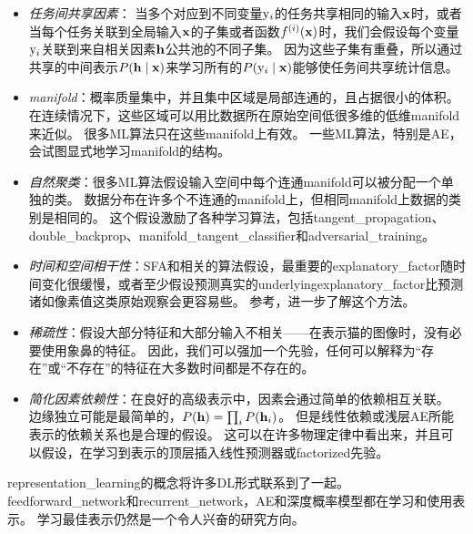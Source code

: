 \begin{itemize}
	\item \emph{任务间共享因素}：
	当多个对应到不同变量$\mathrm{y}_i$的任务共享相同的输入$\mathbf{x}$时，或者当每个任务关联到全局输入$\mathbf{x}$的子集或者函数$f^{(i)}(\mathbf{x})$时，我们会假设每个变量$\mathrm{y}_i$关联到来自相关因素$\mathbf{h}$公共池的不同子集。
	因为这些子集有重叠，所以通过共享的中间表示$ P(\mathbf{h} \mid \mathbf{x})$来学习所有的$P(\mathrm{y}_i \mid \mathbf{x})$能够使任务间共享统计信息。


	\item \emph{\gls{manifold}}：概率质量集中，并且集中区域是局部连通的，且占据很小的体积。
	在连续情况下，这些区域可以用比数据所在原始空间低很多维的低维\gls{manifold}来近似。
	很多\gls{ML}算法只在这些\gls{manifold}上有效\citep{Goodfellow-2015-adversarial}。
	一些\gls{ML}算法，特别是\gls{AE}，会试图显式地学习\gls{manifold}的结构。


	\item \emph{自然聚类}：很多\gls{ML}算法假设输入空间中每个连通\gls{manifold}可以被分配一个单独的类。
	数据分布在许多个不连通的\gls{manifold}上，但相同\gls{manifold}上数据的类别是相同的。
	这个假设激励了各种学习算法，包括\gls{tangent_propagation}、\gls{double_backprop}、\gls{manifold_tangent_classifier}和\gls{adversarial_training}。


	\item \emph{时间和空间相干性}：\gls{SFA}和相关的算法假设，最重要的\gls{explanatory_factor}随时间变化很缓慢，或者至少假设预测真实的\gls{underlying}\gls{explanatory_factor}比预测诸如像素值这类原始观察会更容易些。
	参考，进一步了解这个方法。


	\item \emph{稀疏性}：假设大部分特征和大部分输入不相关——在表示猫的图像时，没有必要使用象鼻的特征。
	因此，我们可以强加一个先验，任何可以解释为``存在''或``不存在''的特征在大多数时间都是不存在的。


	\item \emph{简化因素依赖性}：在良好的高级表示中，因素会通过简单的依赖相互关联。
	边缘独立可能是最简单的，$P(\mathbf{h}) = \prod_i P(\mathbf{h}_i)$。
	但是线性依赖或浅层\gls{AE}所能表示的依赖关系也是合理的假设。
	这可以在许多物理定律中看出来，并且可以假设，在学习到表示的顶层插入线性预测器或\gls{factorized}先验。
\end{itemize}


\gls{representation_learning}的概念将许多\gls{DL}形式联系到了一起。
\gls{feedforward_network}和\gls{recurrent_network}，\gls{AE}和深度概率模型都在学习和使用表示。
学习最佳表示仍然是一个令人兴奋的研究方向。

